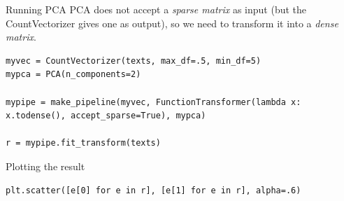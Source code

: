 \documentclass[compress]{beamer}
\begin{document}
\begin{frame}{Running PCA}
PCA does not accept a \textit{sparse matrix} as input (but the CountVectorizer gives one as output), so we need to transform it into a \textit{dense matrix}.

\begin{lstlisting}
myvec = CountVectorizer(texts, max_df=.5, min_df=5)
mypca = PCA(n_components=2)

mypipe = make_pipeline(myvec, FunctionTransformer(lambda x: x.todense(), accept_sparse=True), mypca)

r = mypipe.fit_transform(texts)
\end{lstlisting}
\end{frame}



\begin{frame}{Plotting the result}
\begin{lstlisting}
plt.scatter([e[0] for e in r], [e[1] for e in r], alpha=.6)
\end{lstlisting}



\end{frame}
\end{document}
